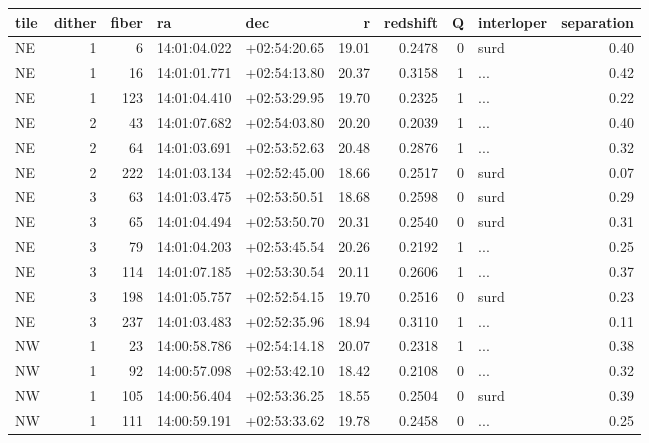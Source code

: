 \begin{tabular}{lrrllrrrlr}
\toprule
tile &  dither &  fiber &            ra &           dec &      r &  redshift &  Q & interloper &  separation \\
\midrule
  NE &       1 &      6 &  14:01:04.022 &  +02:54:20.65 &  19.01 &    0.2478 &  0 &       surd &        0.40 \\
  NE &       1 &     16 &  14:01:01.771 &  +02:54:13.80 &  20.37 &    0.3158 &  1 &        ... &        0.42 \\
  NE &       1 &    123 &  14:01:04.410 &  +02:53:29.95 &  19.70 &    0.2325 &  1 &        ... &        0.22 \\
  NE &       2 &     43 &  14:01:07.682 &  +02:54:03.80 &  20.20 &    0.2039 &  1 &        ... &        0.40 \\
  NE &       2 &     64 &  14:01:03.691 &  +02:53:52.63 &  20.48 &    0.2876 &  1 &        ... &        0.32 \\
  NE &       2 &    222 &  14:01:03.134 &  +02:52:45.00 &  18.66 &    0.2517 &  0 &       surd &        0.07 \\
  NE &       3 &     63 &  14:01:03.475 &  +02:53:50.51 &  18.68 &    0.2598 &  0 &       surd &        0.29 \\
  NE &       3 &     65 &  14:01:04.494 &  +02:53:50.70 &  20.31 &    0.2540 &  0 &       surd &        0.31 \\
  NE &       3 &     79 &  14:01:04.203 &  +02:53:45.54 &  20.26 &    0.2192 &  1 &        ... &        0.25 \\
  NE &       3 &    114 &  14:01:07.185 &  +02:53:30.54 &  20.11 &    0.2606 &  1 &        ... &        0.37 \\
  NE &       3 &    198 &  14:01:05.757 &  +02:52:54.15 &  19.70 &    0.2516 &  0 &       surd &        0.23 \\
  NE &       3 &    237 &  14:01:03.483 &  +02:52:35.96 &  18.94 &    0.3110 &  1 &        ... &        0.11 \\
  NW &       1 &     23 &  14:00:58.786 &  +02:54:14.18 &  20.07 &    0.2318 &  1 &        ... &        0.38 \\
  NW &       1 &     92 &  14:00:57.098 &  +02:53:42.10 &  18.42 &    0.2108 &  0 &        ... &        0.32 \\
  NW &       1 &    105 &  14:00:56.404 &  +02:53:36.25 &  18.55 &    0.2504 &  0 &       surd &        0.39 \\
  NW &       1 &    111 &  14:00:59.191 &  +02:53:33.62 &  19.78 &    0.2458 &  0 &        ... &        0.25 \\

\end{tabular}
